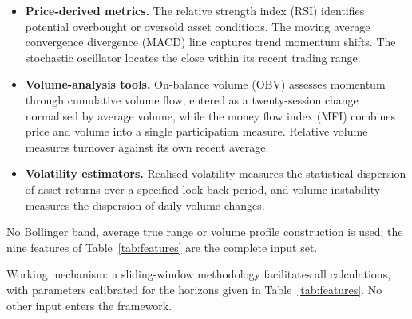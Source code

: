 \documentclass{singlecol-new}
\theoremstyle{TH}{
\newtheorem{lemma}{Lemma}
\newtheorem{theorem}[lemma]{Theorem}
\newtheorem{corrolary}[lemma]{Corrolary}
\newtheorem{conjecture}[lemma]{Conjecture}
\newtheorem{proposition}[lemma]{Proposition}
\newtheorem{claim}[lemma]{Claim}
\newtheorem{stheorem}[lemma]{Wrong Theorem}
\newtheorem{algorithm}{Algorithm}
}
\theoremstyle{THrm}{
\newtheorem{definition}{Definition}[section]
\newtheorem{question}{Question}[section]
\newtheorem{remark}{Remark}
\newtheorem{scheme}{Scheme}
}
\theoremstyle{THhit}{
\newtheorem{case}{Case}[section]
}
\begin{document}
\begin{itemize}
\item \textbf{Price-derived metrics.} The relative strength index (RSI) identifies
potential overbought or oversold asset conditions. The moving average convergence
divergence (MACD) line captures trend momentum shifts. The stochastic oscillator locates
the close within its recent trading range.
\item \textbf{Volume-analysis tools.} On-balance volume (OBV) assesses momentum through
cumulative volume flow, entered as a twenty-session change normalised by average volume,
while the money flow index (MFI) combines price and volume into a single participation
measure. Relative volume measures turnover against its own recent average.
\item \textbf{Volatility estimators.} Realised volatility measures the statistical
dispersion of asset returns over a specified look-back period, and volume instability
measures the dispersion of daily volume changes.
\end{itemize}

No Bollinger band, average true range or volume profile construction is used; the nine
features of Table~\ref{tab:features} are the complete input set.

Working mechanism: a sliding-window methodology facilitates all calculations, with
parameters calibrated for the horizons given in Table~\ref{tab:features}. No other input
enters the framework.
\end{document}
